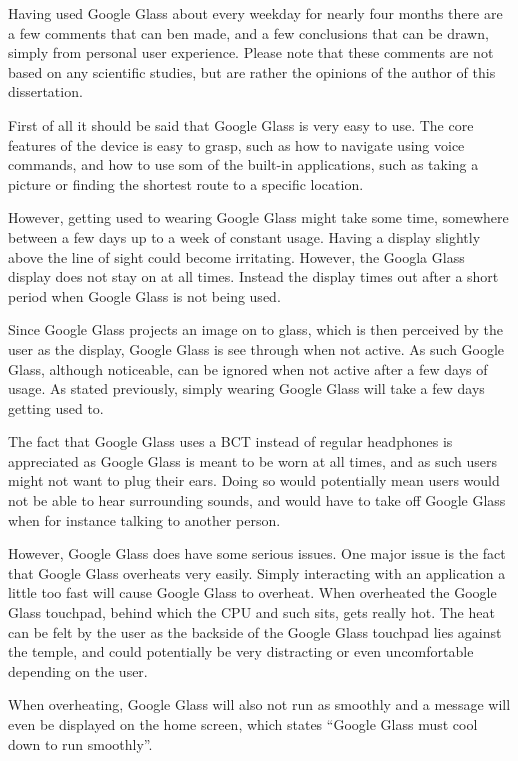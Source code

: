 Having used Google Glass about every weekday for nearly four months there are a few comments that can ben made, and a few conclusions that can be drawn, simply from personal user experience. Please note that these comments are not based on any scientific studies, but are rather the opinions of the author of this dissertation.

First of all it should be said that Google Glass is very easy to use. The core features of the device is easy to grasp, such as how to navigate using voice commands, and how to use som of the built-in applications, such as taking a picture or finding the shortest route to a specific location.

However, getting used to wearing Google Glass might take some time, somewhere between a few days up to a week of constant usage. Having a display slightly above the line of sight could become irritating. However, the Googla Glass display does not stay on at all times. Instead the display times out after a short period when Google Glass is not being used.

Since Google Glass projects an image on to glass, which is then perceived by the user as the display, Google Glass is see through when not active. As such Google Glass, although noticeable, can be ignored when not active after a few days of usage. As stated previously, simply wearing Google Glass will take a few days getting used to.

The fact that Google Glass uses a BCT instead of regular headphones is appreciated as Google Glass is meant to be worn at all times, and as such users might not want to plug their ears. Doing so would potentially mean users would not be able to hear surrounding sounds, and would have to take off Google Glass when for instance talking to another person.

However, Google Glass does have some serious issues. One major issue is the fact that Google Glass overheats very easily. Simply interacting with an application a little too fast will cause Google Glass to overheat. When overheated the Google Glass touchpad, behind which the CPU and such sits, gets really hot. The heat can be felt by the user as the backside of the Google Glass touchpad lies against the temple, and could potentially be very distracting or even uncomfortable depending on the user.

When overheating, Google Glass will also not run as smoothly and a message will even be displayed on the home screen, which states ``Google Glass must cool down to run smoothly''.

